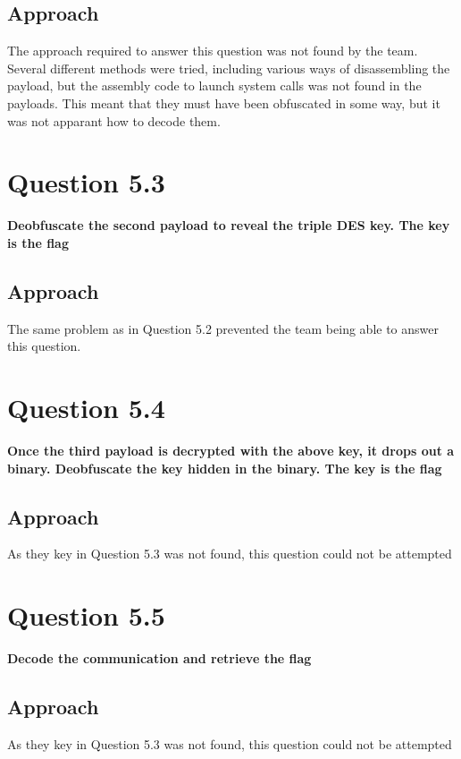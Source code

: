 \subsection{Approach}
The approach required to answer this question was not found by the team.
Several different methods were tried, including various ways of
disassembling the payload, but the assembly code to launch system calls
was not found in the payloads. This meant that they must have been
obfuscated in some way, but it was not apparant how to decode them.

\section{Question 5.3}
\textbf{Deobfuscate the second payload to reveal the triple DES key. The key is
the flag}
\subsection{Approach}
The same problem as in Question 5.2 prevented the team being able to answer
this question.

\section{Question 5.4}
\textbf{Once the third payload is decrypted with the above key, it drops out a
binary. Deobfuscate the key hidden in the binary. The key is the flag}
\subsection{Approach}
As they key in Question 5.3 was not found, this question could not be attempted

\section{Question 5.5}
\textbf{Decode the communication and retrieve the flag}
\subsection{Approach}
As they key in Question 5.3 was not found, this question could not be attempted
